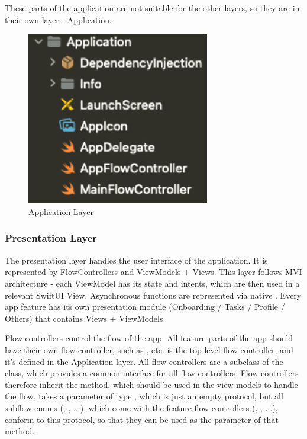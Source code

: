 \documentclass[
  biblatex = false,
  language=english,
  figures=false,
  sourcecodes,
  glossaries,
  index
]{kidiplom}
\begin{document}
These parts of the application are not suitable for the other layers, so they are in their own layer - Application.

\begin{figure}[h!]
\centering
\includegraphics[width=8cm]{image5}
\caption{Application Layer}
\label{fig:image5}
\end{figure}

\subsubsection{Presentation Layer}
The presentation layer handles the user interface of the application. It is represented by FlowControllers and ViewModels + Views. This layer follows MVI architecture - each ViewModel has its state and intents, which are then used in a relevant SwiftUI View. Asynchronous functions are represented via native .
Every app feature has its own presentation module (Onboarding / Tasks / Profile / Others) that contains Views + ViewModels. 

Flow controllers control the flow of the app. All feature parts of the app should have their own flow controller, such as ,  etc.  is the top-level flow controller, and it's defined in the Application layer. All flow controllers are a subclass of the  class, which provides a common interface for all flow controllers. Flow controllers therefore inherit the  method, which should be used in the view models to handle the flow.  takes a parameter of type , which is just an empty protocol, but all subflow enums (, , ...), which come with the feature flow controllers (, , ...), conform to this protocol, so that they can be used as the parameter of that method.
\end{document}
